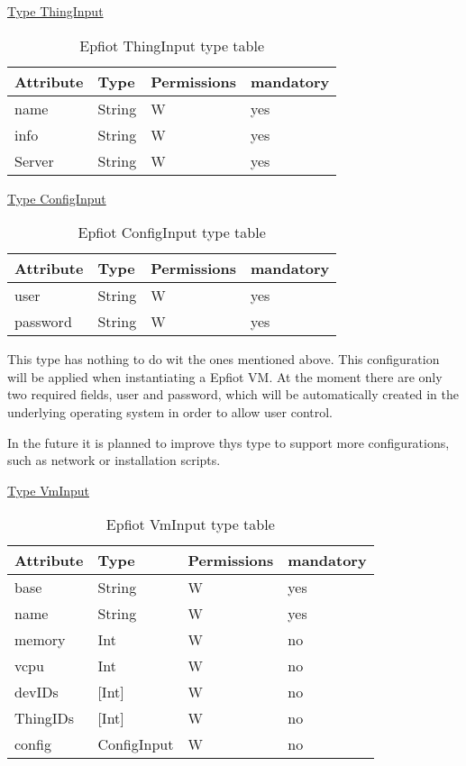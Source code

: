 \underline{Type ThingInput}
\begin{table}[H]
\begin{center}
\begin{tabular}[b]{|l|l|l|l|}
    \hline
    Attribute & Type & Permissions & mandatory \\
    \hline
    name & String & W & yes\\
    \hline
    info & String & W & yes\\
    \hline
    Server & String & W & yes\\
    \hline
\end{tabular}
\caption{Epfiot ThingInput type table}
\label{table1}
\end{center}
\end{table}

\underline{Type ConfigInput}
\begin{table}[H]
\begin{center}
\begin{tabular}[b]{|l|l|l|l|}
    \hline
    Attribute & Type & Permissions & mandatory \\
    \hline
    user & String & W & yes\\
    \hline
    password & String & W & yes\\
    \hline
\end{tabular}
\caption{Epfiot ConfigInput type table}
\label{table1}
\end{center}
\end{table}

This type has nothing to do wit the ones mentioned above.
This configuration will be applied when instantiating a Epfiot VM. At the moment there are only two required fields, user and password, which will be automatically created in the underlying operating system in order to allow user control.

In the future it is planned to improve thys type to support more configurations, such as network or installation scripts.
\newpage

\underline{Type VmInput}
\begin{table}[H]
\begin{center}
\begin{tabular}[b]{|l|l|l|l|}
    \hline
    Attribute & Type & Permissions & mandatory \\
    \hline
    base & String & W & yes\\
    \hline
    name & String & W & yes\\
    \hline
    memory & Int & W & no\\
    \hline
    vcpu & Int & W & no\\
    \hline
    devIDs & [Int] & W & no\\
    \hline
    ThingIDs & [Int] & W & no\\
    \hline
    config & ConfigInput & W & no\\
    \hline
\end{tabular}
\caption{Epfiot VmInput type table}
\label{table1}
\end{center}
\end{table}


